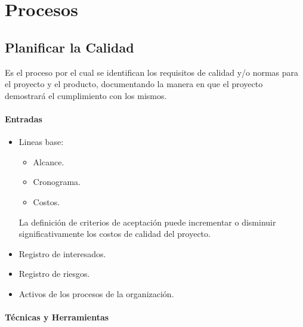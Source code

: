 \documentclass[a4paper,twosides]{article}
\newlength{\wideitemsep}
\let\olditem\item
\renewcommand{\item}{\setlength{\itemsep}{\wideitemsep}\olditem}
\begin{document}
\section*{Procesos}
\subsection{Planificar la Calidad} \label{sec:planificar_calidad}
Es el proceso por el cual se identifican los requisitos de calidad y/o normas para el proyecto y el producto, documentando la manera en que el proyecto demostrará el cumplimiento con los mismos.
\paragraph{Entradas}
\begin{itemize}
\item Lineas base:
\begin{itemize}
\item Alcance.
\item Cronograma.
\item Costos.
\end{itemize}
\par La definición de criterios de aceptación puede incrementar o disminuir significativamente los costos de calidad del proyecto.
\item Registro de interesados.
\item Registro de riesgos.
\item Activos de los procesos de la organización.
\end{itemize}

\paragraph{Técnicas y Herramientas}
\end{document}
